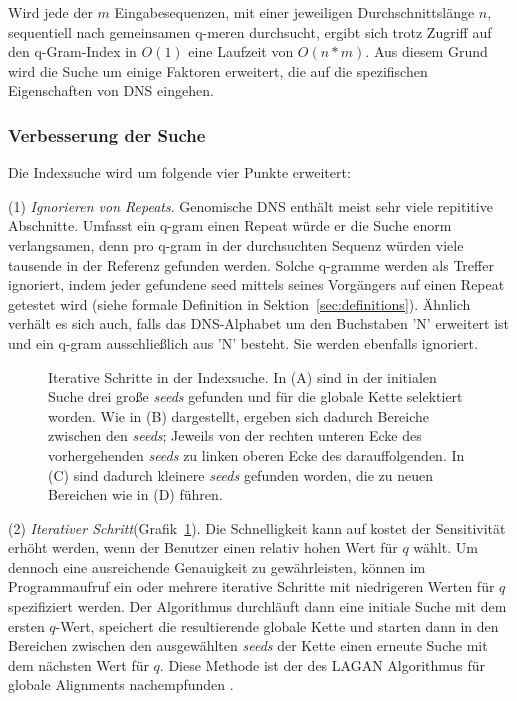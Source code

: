 \documentclass[12pt]{article}
\begin{document}
Wird jede der $m$ Eingabesequenzen, mit einer jeweiligen Durchschnittslänge $n$, sequentiell nach gemeinsamen q-meren durchsucht, ergibt sich trotz Zugriff auf den q-Gram-Index in $O(1)$ eine Laufzeit von $O(n*m)$. Aus diesem Grund wird die Suche um einige Faktoren erweitert, die auf die spezifischen Eigenschaften von DNS eingehen.

\subsubsection{Verbesserung der Suche}
Die Indexsuche wird um folgende vier Punkte erweitert:

(1) \emph{Ignorieren von Repeats}. Genomische DNS enthält meist sehr viele repititive Abschnitte. Umfasst ein q-gram einen Repeat würde er die Suche enorm verlangsamen, denn pro q-gram in der durchsuchten Sequenz würden viele tausende in der Referenz gefunden werden. Solche q-gramme werden als Treffer ignoriert, indem jeder gefundene seed mittels seines Vorgängers auf einen Repeat getestet wird (siehe formale Definition in Sektion~\ref{sec:definitions}). Ähnlich verhält es sich auch, falls das DNS-Alphabet um den Buchstaben 'N' erweitert ist und ein q-gram ausschließlich aus 'N' besteht. Sie werden ebenfalls ignoriert.

\begin{figure}[b]
\caption{\label{fig:iterativ}\footnotesize Iterative Schritte in der Indexsuche. In (A) sind in der initialen Suche drei große \textit{seeds} gefunden und für die globale Kette selektiert worden. Wie in (B) dargestellt, ergeben sich dadurch Bereiche zwischen den \textit{seeds}; Jeweils von der rechten unteren Ecke des vorhergehenden \textit{seeds} zu linken oberen Ecke des darauffolgenden. In (C) sind dadurch kleinere \textit{seeds} gefunden worden, die zu neuen Bereichen wie in (D) führen.}
\end{figure}

(2) \emph{Iterativer Schritt}(Grafik~\ref{fig:iterativ}). Die Schnelligkeit kann auf kostet der Sensitivität erhöht werden, wenn der Benutzer einen relativ hohen Wert für $q$ wählt. Um dennoch eine ausreichende Genauigkeit zu gewährleisten, können im Programmaufruf ein oder mehrere iterative Schritte mit niedrigeren Werten für $q$ spezifiziert werden. Der Algorithmus durchläuft dann eine initiale Suche mit dem ersten $q$-Wert, speichert die resultierende globale Kette und starten dann in den Bereichen zwischen den ausgewählten \textit{seeds} der Kette einen erneute Suche mit dem nächsten Wert für $q$. Diese Methode ist der des LAGAN Algorithmus für globale Alignments nachempfunden \cite{brudno03lagan}.
\end{document}
